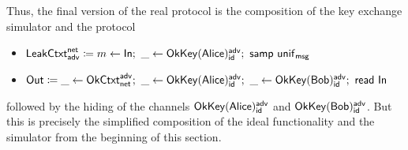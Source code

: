 \noindent Thus, the final version of the real protocol is the composition of the key exchange simulator and the protocol
\begin{itemize}
\item $\LeakCtxt^\net_\adv \coloneqq m \leftarrow \In; \ \_ \leftarrow \OkKey(\Alice)^\adv_\id; \ \samp{\unif_\msg}$
\item $\mathsf{Out} \coloneqq \_ \leftarrow \mathsf{OkCtxt}^{\mathsf{adv}}_{\mathsf{net}}; \ \_ \leftarrow \mathsf{OkKey}(\mathsf{Alice})^{\mathsf{adv}}_{\mathsf{id}}; \ \_ \leftarrow \mathsf{OkKey}(\mathsf{Bob})^{\mathsf{adv}}_{\mathsf{id}}; \ \mathsf{read} \ \mathsf{In}$
\end{itemize}
followed by the hiding of the channels $\mathsf{OkKey}(\mathsf{Alice})^{\mathsf{adv}}_{\mathsf{id}}$ and $\mathsf{OkKey}(\mathsf{Bob})^{\mathsf{adv}}_{\mathsf{id}}$. But this is precisely the simplified composition of the ideal functionality and the simulator from the beginning of this section.